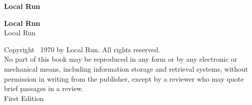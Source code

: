 \documentclass[12pt,openright]{book}
\renewcommand{\normalsize}{\fontsize{10.5pt}{14pt}\selectfont}
\begin{document}
\frontmatter
\pagestyle{plain}

%

\cleardoublepage
\thispagestyle{empty}
\vspace*{\fill}
\begin{center}
{\Huge\textbf{Local Run}}
\end{center}
\vspace*{\fill}
\cleardoublepage

%

\thispagestyle{empty}
\vspace*{2in}
\begin{center}
{\Huge\textbf{Local Run}}\\[1em]
{\large Local Run}
\end{center}
\vfill
\clearpage

%

\thispagestyle{empty}
\fontsize{8pt}{10pt}\selectfont
\setlength{\parindent}{0pt}
\noindent\begin{flushleft}
Copyright \textcopyright\ 1970 by Local Run. All rights reserved.\\[0.5em]
No part of this book may be reproduced in any form or by any electronic or mechanical means, including information storage and retrieval systems, without permission in writing from the publisher, except by a reviewer who may quote brief passages in a review.\\[0.5em]
First Edition\\[0.5em]
\end{flushleft}
\normalsize
\clearpage
\end{document}
